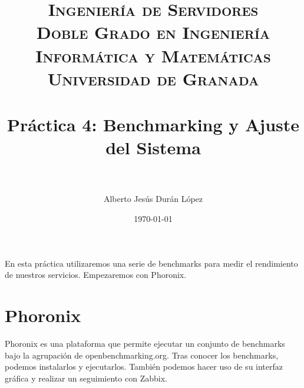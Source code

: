 


\title{	
\normalfont \normalsize 
\textsc{\textbf{Ingeniería de Servidores} \\ Doble Grado en Ingeniería Informática y Matemáticas \\ Universidad de Granada} \\ [25pt] %
\horrule{0.5pt} \\[0.4cm] %
\huge Práctica 4: Benchmarking y Ajuste del Sistema \\ %
\horrule{2pt} \\[0.5cm] %
}

\author{Alberto Jesús Durán López} %

\date{\normalsize\today} %




\maketitle %





\newpage

En esta práctica utilizaremos una serie de benchmarks para medir el rendimiento de 
nuestros servicios. Empezaremos con Phoronix.

\section{Phoronix}

Phoronix es una plataforma que permite ejecutar un conjunto de benchmarks bajo la agrupación de openbenchmarking.org. Tras conocer los benchmarks, podemos instalarlos y ejecutarlos. También podemos hacer uso de su interfaz gráfica y realizar un seguimiento con Zabbix.

